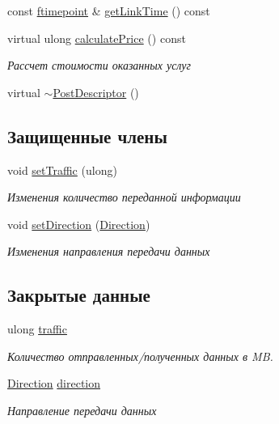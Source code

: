 \begin{DoxyCompactItemize}
const \hyperlink{networkservice_8h_ac877dfabb0f4f6a8184aa821b447e81d}{ftimepoint} \& \hyperlink{class_network_service_1_1_post_descriptor_a932f88eafff63fb1d9a687dd65a14cea}{get\+Link\+Time} () const 
\item 
virtual ulong \hyperlink{class_network_service_1_1_post_descriptor_ae88dfdc2d12299b6d3b14786d16e3251}{calculate\+Price} () const 
\begin{DoxyCompactList}\small\item\em Рассчет стоимости оказанных услуг \end{DoxyCompactList}\item 
virtual \hyperlink{class_network_service_1_1_post_descriptor_a29380cff7ee5b04cc983056deadaa7f1}{$\sim$\+Post\+Descriptor} ()
\end{DoxyCompactItemize}
\subsection*{Защищенные члены}
\begin{DoxyCompactItemize}
\item 
void \hyperlink{class_network_service_1_1_post_descriptor_a5e3e03cbe0e31397bed9e17428348bd1}{set\+Traffic} (ulong)
\begin{DoxyCompactList}\small\item\em Изменения количество переданной информации \end{DoxyCompactList}\item 
void \hyperlink{class_network_service_1_1_post_descriptor_ab976b83349507b5e6841fcbc2ddc9edd}{set\+Direction} (\hyperlink{namespace_network_service_abe1196dad9e8afcbc5c6b38196ce2c65}{Direction})
\begin{DoxyCompactList}\small\item\em Изменения направления передачи данных \end{DoxyCompactList}\end{DoxyCompactItemize}
\subsection*{Закрытые данные}
\begin{DoxyCompactItemize}
\item 
ulong \hyperlink{class_network_service_1_1_post_descriptor_ae2eef559828a42ec299ab59711f88e59}{traffic}
\begin{DoxyCompactList}\small\item\em Количество отправленных/полученных данных в M\+B. \end{DoxyCompactList}\item 
\hyperlink{namespace_network_service_abe1196dad9e8afcbc5c6b38196ce2c65}{Direction} \hyperlink{class_network_service_1_1_post_descriptor_a04faf66e747b2d4f2d89bf1e92f4ab5c}{direction}
\begin{DoxyCompactList}\small\item\em Направление передачи данных \end{DoxyCompactList}\end{DoxyCompactItemize}


